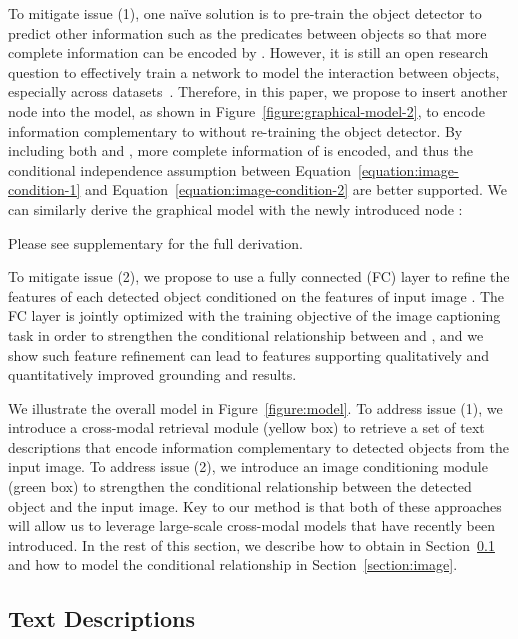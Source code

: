 \documentclass[10pt,twocolumn,letterpaper]{article}
\begin{document}
To mitigate issue (1), one na\"ive solution is to pre-train the object detector to predict other information such as the predicates between objects so that more complete information can be encoded by .
However, it is still an open research question to effectively train a network to model the interaction between objects, especially across datasets~\cite{yang2018graph,xu2017scene,li2017scene,zellers2018neural,tian2020image}.
Therefore, in this paper, we propose to insert another node  into the model, as shown in Figure~\ref{figure:graphical-model-2}, to encode information complementary to  without re-training the object detector.
By including both  and , more complete information of  is encoded, and thus the conditional independence assumption between Equation~\ref{equation:image-condition-1} and Equation~\ref{equation:image-condition-2} are better supported.
We can similarly derive the graphical model with the newly introduced node :

Please see supplementary for the full derivation.

To mitigate issue (2), we propose to use a fully connected (FC) layer to refine the features of each detected object conditioned on the features of input image .
The FC layer is jointly optimized with the training objective of the image captioning task in order to strengthen the conditional relationship between  and , and we show such feature refinement can lead to features supporting qualitatively and quantitatively improved grounding and  results. 

We illustrate the overall model in Figure~\ref{figure:model}.
To address issue (1), we introduce a cross-modal retrieval module (yellow box) to retrieve a set of text descriptions  that encode information complementary to detected objects  from the input image.
To address issue (2), we introduce an image conditioning module (green box) to strengthen the conditional relationship between the detected object and the input image.
Key to our method is that both of these approaches will allow us to leverage large-scale cross-modal models that have recently been introduced. In the rest of this section, we describe how to obtain  in Section~\ref{section:text} and how to model the conditional relationship in Section~\ref{section:image}.

\subsection{Text Descriptions} \label{section:text}
\end{document}
